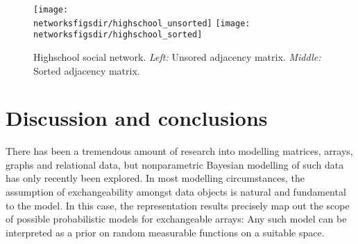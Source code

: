 \begin{figure}[ht]
  \centering
  \texttt{[image: \\networksfigsdir/highschool\_unsorted]}
  \texttt{[image: \\networksfigsdir/highschool\_sorted]}
  \caption[Unsorted and sorted highschool social network adjacency matrices.]{Highschool social network. 
    \emph{Left:} Unsored adjacency matrix. 
    \emph{Middle:} Sorted adjacency matrix.
  }
  \label{fig:networks:highschool}
\end{figure}


\section{Discussion and conclusions}

There has been a tremendous amount of research into modelling matrices, arrays, graphs and relational data, but nonparametric
Bayesian modelling of such data has only recently been explored.
In most modelling circumstances, the assumption of exchangeability amongst data objects is natural and fundamental to the model.
In this case, the representation results 
\citep{Aldous1981-lg,Hoover1979-br,Kallenberg1992-gb} 
precisely map out the scope of possible probabilistic models for exchangeable arrays:
Any such model can be interpreted as a prior on random measurable functions on a suitable space.

